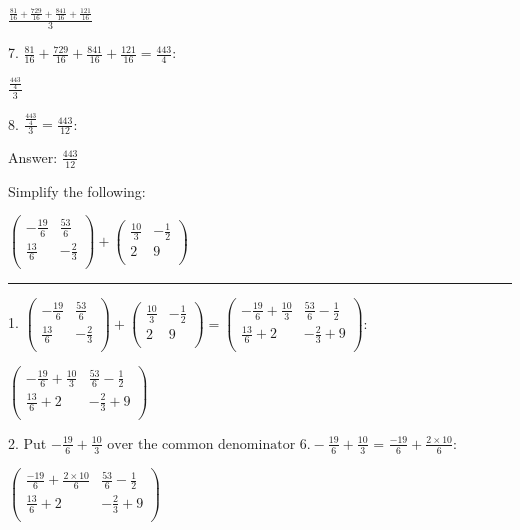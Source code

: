 \documentclass{article}
\begin{document}
$\frac{\frac{81}{16}+\frac{729}{16}+\frac{841}{16}+\frac{121}{16}}{3}$

7. $\frac{81}{16}+\frac{729}{16}+\frac{841}{16}+\frac{121}{16}=\frac{443}{4}$:

$\frac{\frac{443}{4}}{3}$

8. $\frac{\frac{443}{4}}{3}=\frac{443}{12}$:

Answer: $\frac{443}{12}$

\pagebreak

Simplify the following:

$\left(
\begin{array}{cc}
-\frac{19}{6} & \frac{53}{6} \\
 \frac{13}{6} & -\frac{2}{3} \\
\end{array}
\right)+\left(
\begin{array}{cc}
\frac{10}{3} & -\frac{1}{2} \\
 2 & 9 \\
\end{array}
\right)$

\hrule

1. $\left(
\begin{array}{cc}
-\frac{19}{6} & \frac{53}{6} \\
 \frac{13}{6} & -\frac{2}{3} \\
\end{array}
\right)+\left(
\begin{array}{cc}
\frac{10}{3} & -\frac{1}{2} \\
 2 & 9 \\
\end{array}
\right)=\left(
\begin{array}{cc}
-\frac{19}{6}+\frac{10}{3} & \frac{53}{6}-\frac{1}{2} \\
 \frac{13}{6}+2 & -\frac{2}{3}+9 \\
\end{array}
\right):$

$\left(
\begin{array}{cc}
-\frac{19}{6}+\frac{10}{3} & \frac{53}{6}-\frac{1}{2} \\
 \frac{13}{6}+2 & -\frac{2}{3}+9 \\
\end{array}
\right)$

2. Put $-\frac{19}{6}+\frac{10}{3}\text{ over the common denominator }6. -\frac{19}{6}+\frac{10}{3}\text{ = }\frac{-19}{6}+\frac{2\times 10}{6}$:

$\left(
\begin{array}{cc}
\frac{-19}{6}+\frac{2\times 10}{6} & \frac{53}{6}-\frac{1}{2} \\
 \frac{13}{6}+2 & -\frac{2}{3}+9 \\
\end{array}
\right)$
\end{document}
